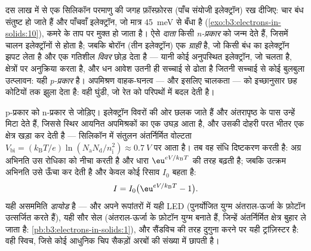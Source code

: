 \begin{definition}[अपमिश्रण]\label{def:b3:electrons-in-solids:doping}
दस लाख में से एक सिलिकॉन परमाणु की जगह फ़ॉस्फ़ोरस (पाँच संयोजी
इलेक्ट्रॉन) रख दीजिए: चार बंध संतुष्ट हो जाते हैं और पाँचवाँ
इलेक्ट्रॉन, जो मात्र \qty{45}{meV} से बँधा है
(\cref{exo:b3:electrons-in-solids:10}), कमरे के ताप पर मुक्त हो जाता
है। ऐसे \emph{दाता} किसी \emph{n-प्रकार}
 को जन्म देते हैं, जिसमें चालन इलेक्ट्रॉनों से होता है; जबकि
बोरॉन (तीन इलेक्ट्रॉन) एक \emph{ग्राही} है, जो किसी बंध का इलेक्ट्रॉन
झपट लेता है और एक गतिशील \emph{विवर} छोड़ देता है --- यानी कोई अनुपस्थित
इलेक्ट्रॉन, जो चलता है, क्षेत्रों पर अनुक्रिया करता है, और धन आवेश
उतनी ही सच्चाई से ढोता है जितनी सच्चाई से कोई बुलबुला उत्प्लावन:
यही \emph{p-प्रकार} है। अपमिश्रण वाहक-घनत्व --- और इसलिए चालकता ---
को इच्छानुसार छह कोटियों तक झुला देता है: वही घुंडी, जो रेत को
परिपथों में बदल देती है।
\end{definition}

\begin{proposition}[P--N संधि]\label{prop:b3:electrons-in-solids:junction}
p-प्रकार को n-प्रकार से जोड़िए। इलेक्ट्रॉन विवरों की ओर छलक जाते हैं
और अंतरापृष्ठ के पास उन्हें मिटा देते हैं, जिससे स्थिर आयनित
अपमिश्रकों का एक \emph{} उघड़ आता है, और उसकी दोहरी परत
भीतर एक क्षेत्र खड़ा कर देती है --- सिलिकॉन में संतुलन अंतर्निर्मित
वोल्टता $V_{\text{bi}} = (k_{\text{B}}T/e)
\ln(N_{\text{a}}N_{\text{d}}/n_{\text{i}}^2) \approx
\qty{0.7}{V}$ पर आता है। तब वह संधि दिष्टकरण करती है: अग्र
अभिनति उस रोधिका को नीचा करती है और धारा
$\eu^{eV/k_{\text{B}}T}$ की तरह बढ़ती है; जबकि उत्क्रम अभिनति उसे ऊँचा
कर देती है और केवल कोई रिसाव $I_0$ बहता है:
\[
I = I_0\big(\eu^{eV/k_{\text{B}}T} - 1\big) .
\]
यही असममिति \emph{डायोड} है --- और अपने रूपांतरों में यही
LED (पुनर्योजित युग्म अंतराल-ऊर्जा के फ़ोटॉन उत्सर्जित करते हैं), यही
सौर सेल (अंतराल-ऊर्जा के फ़ोटॉन युग्म बनाते हैं, जिन्हें अंतर्निर्मित
क्षेत्र बुहार ले जाता है: \cref{pb:b3:electrons-in-solids:1}), और
सैंडविच की तरह दुगुना करने पर यही ट्रांज़िस्टर है: वही स्विच, जिसे
कोई आधुनिक चिप सैकड़ों अरबों की संख्या में छापती है।
\end{proposition}
\admitted


